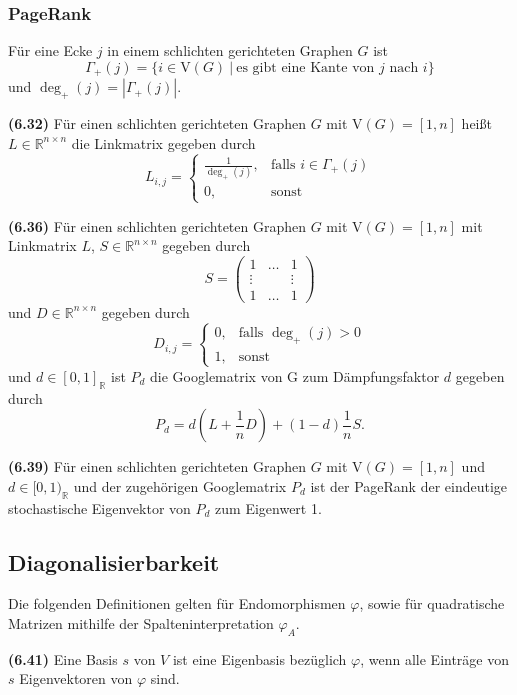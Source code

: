 \documentclass[a4paper,parskip=half*,DIV=15,fontsize=11pt]{scrartcl}
\newlength{\hangwidth}
\newcommand{\skript}[1]{\settowidth{\hangwidth}{\textbf{(#1)} }\hangpara{\hangwidth}{1}\textbf{(#1)} \ignorespaces} %
\begin{document}
\subsubsection{PageRank}

Für eine Ecke $j$ in einem schlichten gerichteten Graphen $G$ ist $$\Gamma_+(j) = \{i \in \text{V}(G)\ |\ \text{es gibt eine Kante von } j \text{ nach } i\}$$ und $\deg_+(j)=|\Gamma_+(j)|$.

\skript{6.32} Für einen schlichten gerichteten Graphen $G$ mit $\text{V}(G)=[1,n]$ heißt $L \in \mathbb{R}^{n \times n}$ die Linkmatrix gegeben durch
$$L_{i,j}=\begin{cases}
\frac{1}{\deg_+(j)}, & \text{falls } i \in \Gamma_+(j) \\
0, & \text{sonst}
\end{cases}$$

\skript{6.36} Für einen schlichten gerichteten Graphen $G$ mit $\text{V}(G)=[1,n]$ mit Linkmatrix $L$, $S \in \mathbb{R}^{n \times n}$ gegeben durch
$$S=\left(\begin{array}{ccc}
1& \dots & 1	\\
\vdots & &  \vdots	\\
1 & \dots & 1
\end{array}\right)$$
und $D \in \mathbb{R}^{n \times n}$ gegeben durch
$$D_{i,j}=\begin{cases}
0, & \text{falls } \deg_+(j) > 0 \\
1, & \text{sonst}
\end{cases}$$
und $d \in [0,1]_\mathbb{R}$ ist $P_d$ die Googlematrix von G zum Dämpfungsfaktor $d$ gegeben durch
$$P_d = d (L + \frac{1}{n} D) + (1-d) \frac{1}{n} S.$$

\skript{6.39} Für einen schlichten gerichteten Graphen $G$ mit $\text{V}(G)=[1,n]$ und $d \in [0,1)_\mathbb{R}$ und der zugehörigen Googlematrix $P_d$ ist der PageRank der eindeutige stochastische Eigenvektor von $P_d$ zum Eigenwert 1.

\subsection{Diagonalisierbarkeit}

Die folgenden Definitionen gelten für Endomorphismen $\varphi$, sowie für quadratische Matrizen mithilfe der Spalteninterpretation $\varphi_A$.

\skript{6.41} Eine Basis $s$ von $V$ ist eine Eigenbasis bezüglich $\varphi$, wenn alle Einträge von $s$ Eigenvektoren von $\varphi$ sind.
\end{document}
